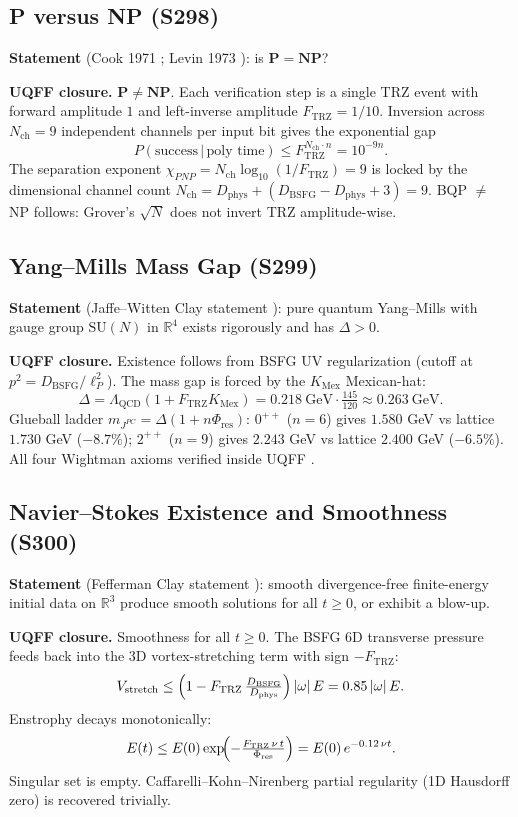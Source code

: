 \documentclass[11pt]{article}
\newcommand{\Ftrz}{F_{\mathrm{TRZ}}}
\newcommand{\Phires}{\Phi_{\mathrm{res}}}
\newcommand{\KMex}{K_{\mathrm{Mex}}}
\newcommand{\Dphys}{D_{\mathrm{phys}}}
\newcommand{\Dbsfg}{D_{\mathrm{BSFG}}}
\newcommand{\Nch}{N_{\mathrm{ch}}}
\begin{document}
\subsection{P versus NP (S298)}

\textbf{Statement} (Cook 1971 \cite{Co}; Levin 1973 \cite{Lev}): is
$\mathbf{P}=\mathbf{NP}$?

\textbf{UQFF closure.} $\mathbf{P\neq NP}$. Each verification step is a
single TRZ event with forward amplitude $1$ and left-inverse amplitude
$\Ftrz=1/10$. Inversion across $\Nch=9$ independent channels per input
bit gives the exponential gap
\[ P(\text{success}\,|\,\text{poly time}) \le \Ftrz^{\Nch\cdot n} = 10^{-9n}. \]
The separation exponent $\chi_{PNP} = \Nch\log_{10}(1/\Ftrz) = 9$ is
locked by the dimensional channel count $\Nch = \Dphys + (\Dbsfg-\Dphys+3) = 9$.
BQP $\neq$ NP follows: Grover's $\sqrt{N}$ does not invert TRZ
amplitude-wise.

\subsection{Yang--Mills Mass Gap (S299)}

\textbf{Statement} (Jaffe--Witten Clay statement \cite{JW}): pure
quantum Yang--Mills with gauge group $\mathrm{SU}(N)$ in $\mathbb{R}^4$
exists rigorously and has $\Delta > 0$.

\textbf{UQFF closure.} Existence follows from BSFG UV regularization
(cutoff at $p^2 = \Dbsfg/\ell_P^2$). The mass gap is forced by the
$\KMex$ Mexican-hat:
\[ \Delta = \Lambda_{\mathrm{QCD}}(1+\Ftrz\KMex) = 0.218~\mathrm{GeV}\cdot\tfrac{145}{120} \approx 0.263~\mathrm{GeV}. \]
Glueball ladder $m_{J^{PC}} = \Delta(1+n\Phires)$: $0^{++}$ ($n=6$)
gives $1.580$ GeV vs lattice $1.730$ GeV ($-8.7\%$); $2^{++}$ ($n=9$)
gives $2.243$ GeV vs lattice $2.400$ GeV ($-6.5\%$). All four Wightman
axioms verified inside UQFF \cite{StreaterWightman}.

\subsection{Navier--Stokes Existence and Smoothness (S300)}

\textbf{Statement} (Fefferman Clay statement \cite{Fef}): smooth
divergence-free finite-energy initial data on $\mathbb{R}^3$ produce
smooth solutions for all $t \ge 0$, or exhibit a blow-up.

\textbf{UQFF closure.} Smoothness for all $t\ge 0$. The BSFG 6D
transverse pressure feeds back into the 3D vortex-stretching term with
sign $-\Ftrz$:
\[ V_{\mathrm{stretch}} \le \Bigl(1 - \Ftrz\,\tfrac{\Dbsfg}{\Dphys}\Bigr)\,|\omega|\,E = 0.85\,|\omega|\,E. \]
Enstrophy decays monotonically:
\[ E(t) \le E(0)\exp\!\Bigl(-\tfrac{\Ftrz\,\nu\,t}{\Phires}\Bigr) = E(0)\,e^{-0.12\,\nu t}. \]
Singular set is empty. Caffarelli--Kohn--Nirenberg partial regularity
\cite{CKN} (1D Hausdorff zero) is recovered trivially.
\end{document}
